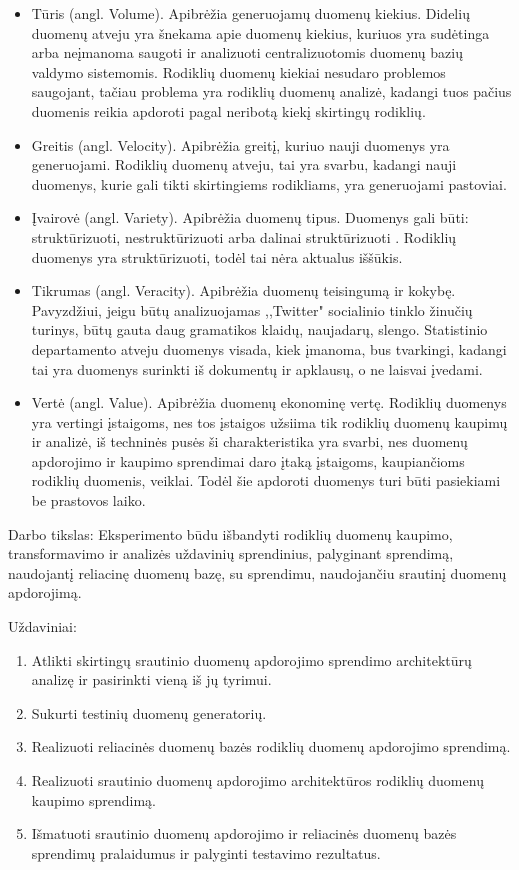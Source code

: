 \documentclass{VUMIFPSkursinis}
\begin{document}
\begin{itemize}
    \item Tūris (angl. Volume). Apibrėžia generuojamų duomenų kiekius. Didelių duomenų atveju yra šnekama apie duomenų kiekius, kuriuos yra sudėtinga arba neįmanoma saugoti 
    ir analizuoti centralizuotomis duomenų bazių valdymo sistemomis. Rodiklių duomenų kiekiai nesudaro problemos saugojant, tačiau problema yra rodiklių duomenų analizė, 
    kadangi tuos pačius duomenis reikia apdoroti pagal neribotą kiekį skirtingų rodiklių.
    \item Greitis (angl. Velocity). Apibrėžia greitį, kuriuo nauji duomenys yra generuojami. Rodiklių duomenų atveju, tai yra svarbu, kadangi nauji duomenys, kurie gali 
    tikti skirtingiems rodikliams, yra generuojami pastoviai.
    \item Įvairovė (angl. Variety). Apibrėžia duomenų tipus. Duomenys gali būti: struktūrizuoti, nestruktūrizuoti arba dalinai struktūrizuoti \cite{zikopoulos2011understanding}. 
    Rodiklių duomenys yra struktūrizuoti, todėl tai nėra aktualus iššūkis.
    \item Tikrumas (angl. Veracity). Apibrėžia duomenų teisingumą ir kokybę. Pavyzdžiui, jeigu būtų analizuojamas ,,Twitter" socialinio tinklo žinučių turinys, būtų gauta
    daug gramatikos klaidų, naujadarų, slengo. 
    Statistinio departamento atveju duomenys visada, kiek įmanoma, bus tvarkingi, kadangi tai yra duomenys surinkti iš dokumentų ir apklausų, o ne laisvai įvedami.
    \item Vertė (angl. Value). Apibrėžia duomenų ekonominę vertę. Rodiklių duomenys yra vertingi įstaigoms, nes tos įstaigos užsiima tik rodiklių duomenų kaupimų ir analizė, iš techninės pusės
    ši charakteristika yra svarbi, nes duomenų apdorojimo ir kaupimo sprendimai daro įtaką įstaigoms, kaupiančioms rodiklių duomenis, veiklai. 
    Todėl šie apdoroti duomenys turi būti pasiekiami be prastovos laiko.
\end{itemize}\par

Darbo tikslas: Eksperimento būdu išbandyti rodiklių duomenų kaupimo, transformavimo ir analizės uždavinių sprendinius, 
palyginant sprendimą, naudojantį reliacinę duomenų bazę, su sprendimu, naudojančiu srautinį duomenų apdorojimą. \par
\newpage
Uždaviniai:
\begin{enumerate}
    \item Atlikti skirtingų srautinio duomenų apdorojimo sprendimo architektūrų analizę ir pasirinkti vieną iš jų tyrimui.
    \item Sukurti testinių duomenų generatorių.
    \item Realizuoti reliacinės duomenų bazės rodiklių duomenų apdorojimo sprendimą.
    \item Realizuoti srautinio duomenų apdorojimo architektūros rodiklių duomenų kaupimo sprendimą.
    \item Išmatuoti srautinio duomenų apdorojimo ir reliacinės duomenų bazės sprendimų pralaidumus ir palyginti testavimo rezultatus.
\end{enumerate}
\end{document}
